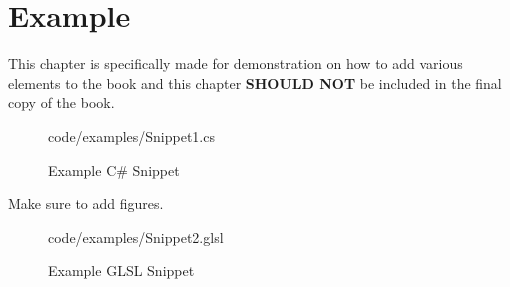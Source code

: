 \chapter{Example}

This chapter is specifically made for demonstration on how to add various elements to the book and this chapter \textbf{SHOULD NOT} be included in the final copy of the book.

\begin{figure}[h]
    \centering
    \colorbox{backgroundcolor}{
        \parbox{0.9\textwidth}{
            
            {code/examples/Snippet1.cs}
        }
    }
    \caption{Example C\# Snippet}
    \label{fig:example_cs_snippet}
\end{figure}


Make sure to add figures.

\begin{figure}[h]
    \centering
    \colorbox{backgroundcolor}{
        \parbox{0.9\textwidth}{
            
            {code/examples/Snippet2.glsl}
        }
    }
    \caption{Example GLSL Snippet}
    \label{fig:example_glsl_snippet}
\end{figure}